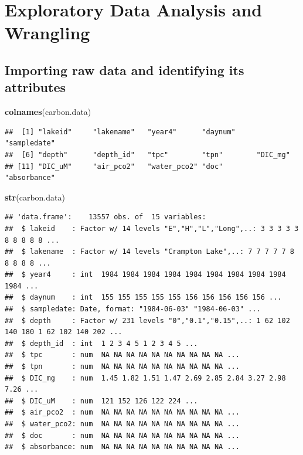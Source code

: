 \documentclass[12pt,]{article}
\newenvironment{Shaded}{\begin{snugshade}}{\end{snugshade}}
\newcommand{\KeywordTok}[1]{\textcolor[rgb]{0.13,0.29,0.53}{\textbf{#1}}}
\newcommand{\NormalTok}[1]{#1}
\begin{document}
\newpage

\section{Exploratory Data Analysis and
Wrangling}\label{exploratory-data-analysis-and-wrangling}

\subsection{Importing raw data and identifying its
attributes}\label{importing-raw-data-and-identifying-its-attributes}

\begin{Shaded}
\begin{Highlighting}[]
\KeywordTok{colnames}\NormalTok{(carbon.data)}
\end{Highlighting}
\end{Shaded}

\begin{verbatim}
##  [1] "lakeid"     "lakename"   "year4"      "daynum"     "sampledate"
##  [6] "depth"      "depth_id"   "tpc"        "tpn"        "DIC_mg"    
## [11] "DIC_uM"     "air_pco2"   "water_pco2" "doc"        "absorbance"
\end{verbatim}

\begin{Shaded}
\begin{Highlighting}[]
\KeywordTok{str}\NormalTok{(carbon.data)}
\end{Highlighting}
\end{Shaded}

\begin{verbatim}
## 'data.frame':    13557 obs. of  15 variables:
##  $ lakeid    : Factor w/ 14 levels "E","H","L","Long",..: 3 3 3 3 3 8 8 8 8 8 ...
##  $ lakename  : Factor w/ 14 levels "Crampton Lake",..: 7 7 7 7 7 8 8 8 8 8 ...
##  $ year4     : int  1984 1984 1984 1984 1984 1984 1984 1984 1984 1984 ...
##  $ daynum    : int  155 155 155 155 155 156 156 156 156 156 ...
##  $ sampledate: Date, format: "1984-06-03" "1984-06-03" ...
##  $ depth     : Factor w/ 231 levels "0","0.1","0.15",..: 1 62 102 140 180 1 62 102 140 202 ...
##  $ depth_id  : int  1 2 3 4 5 1 2 3 4 5 ...
##  $ tpc       : num  NA NA NA NA NA NA NA NA NA NA ...
##  $ tpn       : num  NA NA NA NA NA NA NA NA NA NA ...
##  $ DIC_mg    : num  1.45 1.82 1.51 1.47 2.69 2.85 2.84 3.27 2.98 7.26 ...
##  $ DIC_uM    : num  121 152 126 122 224 ...
##  $ air_pco2  : num  NA NA NA NA NA NA NA NA NA NA ...
##  $ water_pco2: num  NA NA NA NA NA NA NA NA NA NA ...
##  $ doc       : num  NA NA NA NA NA NA NA NA NA NA ...
##  $ absorbance: num  NA NA NA NA NA NA NA NA NA NA ...
\end{verbatim}
\end{document}
